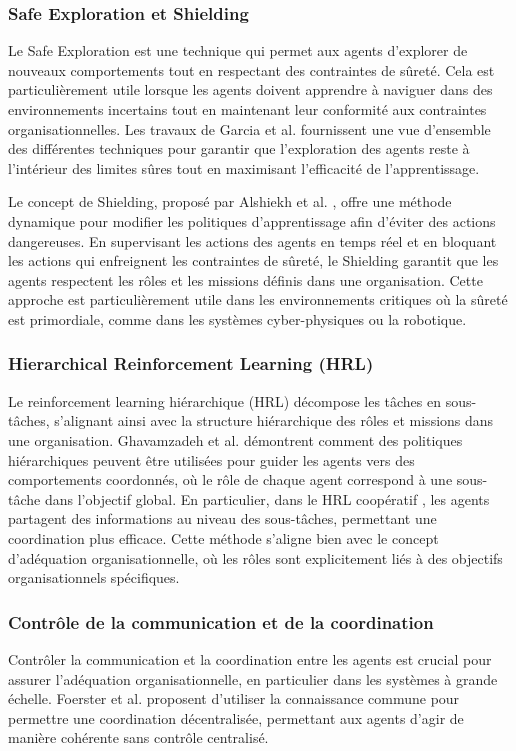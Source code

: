 \documentclass[sigconf,anonymous]{aamas}
\begin{document}
\subsubsection{Safe Exploration et Shielding}
Le Safe Exploration est une technique qui permet aux agents d'explorer de nouveaux comportements tout en respectant des contraintes de sûreté. Cela est particulièrement utile lorsque les agents doivent apprendre à naviguer dans des environnements incertains tout en maintenant leur conformité aux contraintes organisationnelles. Les travaux de Garcia et al. \cite{garcia2015comprehensive} fournissent une vue d'ensemble des différentes techniques pour garantir que l'exploration des agents reste à l'intérieur des limites sûres tout en maximisant l'efficacité de l'apprentissage.

Le concept de Shielding, proposé par Alshiekh et al. \cite{alshiekh2018safe}, offre une méthode dynamique pour modifier les politiques d'apprentissage afin d'éviter des actions dangereuses. En supervisant les actions des agents en temps réel et en bloquant les actions qui enfreignent les contraintes de sûreté, le Shielding garantit que les agents respectent les rôles et les missions définis dans une organisation. Cette approche est particulièrement utile dans les environnements critiques où la sûreté est primordiale, comme dans les systèmes cyber-physiques ou la robotique.


\subsubsection{Hierarchical Reinforcement Learning (HRL)}
Le reinforcement learning hiérarchique (HRL) décompose les tâches en sous-tâches, s'alignant ainsi avec la structure hiérarchique des rôles et missions dans une organisation. Ghavamzadeh et al. \cite{ghavamzadeh2006hrl} démontrent comment des politiques hiérarchiques peuvent être utilisées pour guider les agents vers des comportements coordonnés, où le rôle de chaque agent correspond à une sous-tâche dans l'objectif global.
En particulier, dans le HRL coopératif \cite{ghavamzadeh2006cooperative}, les agents partagent des informations au niveau des sous-tâches, permettant une coordination plus efficace. Cette méthode s'aligne bien avec le concept d'adéquation organisationnelle, où les rôles sont explicitement liés à des objectifs organisationnels spécifiques.

\subsubsection{Contrôle de la communication et de la coordination}
Contrôler la communication et la coordination entre les agents est crucial pour assurer l'adéquation organisationnelle, en particulier dans les systèmes à grande échelle. Foerster et al. \cite{foerster2018communication} proposent d'utiliser la connaissance commune pour permettre une coordination décentralisée, permettant aux agents d'agir de manière cohérente sans contrôle centralisé.
\end{document}
